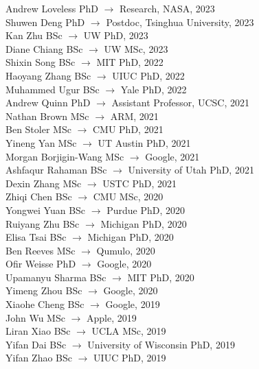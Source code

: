 \documentclass[10pt]{article}
\begin{document}
Andrew Loveless \hfill PhD $\rightarrow$ Research, NASA, 2023\\
Shuwen Deng \hfill PhD $\rightarrow$ Postdoc, Tsinghua University, 2023\\
Kan Zhu \hfill BSc $\rightarrow$ UW PhD, 2023\\
Diane Chiang \hfill BSc $\rightarrow$ UW MSc, 2023\\
Shixin Song \hfill BSc $\rightarrow$ MIT PhD, 2022\\
Haoyang Zhang \hfill BSc $\rightarrow$ UIUC PhD, 2022\\
Muhammed Ugur \hfill BSc $\rightarrow$ Yale PhD, 2022\\
Andrew Quinn \hfill PhD $\rightarrow$ Assistant Professor, UCSC, 2021  \\
Nathan Brown \hfill MSc $\rightarrow$ ARM, 2021 \\
Ben Stoler \hfill MSc $\rightarrow$ CMU PhD, 2021 \\
Yineng Yan \hfill MSc $\rightarrow$ UT Austin PhD, 2021 \\
Morgan Borjigin-Wang \hfill MSc $\rightarrow$ Google, 2021 \\
Ashfaqur Rahaman \hfill BSc $\rightarrow$ University of Utah PhD, 2021\\
Dexin Zhang \hfill MSc $\rightarrow$ USTC PhD, 2021 \\
Zhiqi Chen \hfill BSc $\rightarrow$ CMU MSc, 2020 \\
Yongwei Yuan \hfill BSc $\rightarrow$ Purdue PhD, 2020 \\
Ruiyang Zhu \hfill BSc $\rightarrow$ Michigan PhD, 2020 \\
Elisa Tsai \hfill BSc $\rightarrow$ Michigan PhD, 2020 \\
Ben Reeves \hfill MSc $\rightarrow$ Qumulo, 2020 \\
Ofir Weisse \hfill PhD $\rightarrow$ Google, 2020 \\
Upamanyu Sharma \hfill BSc $\rightarrow$ MIT PhD, 2020 \\
Yimeng Zhou \hfill BSc $\rightarrow$ Google, 2020 \\
Xiaohe Cheng \hfill BSc $\rightarrow$ Google, 2019 \\
John Wu \hfill MSc $\rightarrow$ Apple, 2019\\
Liran Xiao \hfill BSc $\rightarrow$ UCLA MSc, 2019 \\
Yifan Dai \hfill BSc $\rightarrow$ University of Wisconsin PhD, 2019 \\
Yifan Zhao \hfill BSc $\rightarrow$ UIUC PhD, 2019 \\
\end{document}
